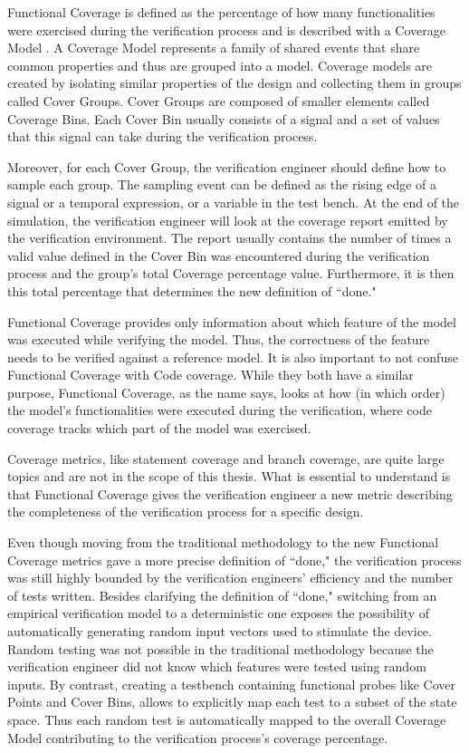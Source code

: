 Functional Coverage is defined as the percentage of how many functionalities
were exercised during the verification process and is described with a Coverage
Model \cite{jain1995advanced}. A Coverage Model represents a family of shared
events that share common properties and thus are grouped into a model. Coverage
models are created by isolating similar properties of the design and collecting
them in groups called Cover Groups. Cover Groups are composed of smaller
elements called Coverage Bins. Each Cover Bin usually consists of a signal and a
set of values that this signal can take during the verification process.

Moreover, for each Cover Group, the verification engineer should define how to
sample each group. The sampling event can be defined as the rising edge of a
signal or a temporal expression, or a variable in the test bench. At the end of
the simulation, the verification engineer will look at the coverage report
emitted by the verification environment. The report usually contains the number
of times a valid value defined in the Cover Bin was encountered during the
verification process and the group's total Coverage percentage value.
Furthermore, it is then this total percentage that determines the new definition
of ``done."

Functional Coverage provides only information about which feature of the model
was executed while verifying the model. Thus, the correctness of the feature
needs to be verified against a reference model. It is also important to not
confuse Functional Coverage with Code coverage. While they both have a similar
purpose, Functional Coverage, as the name says, looks at how (in which order)
the model's functionalities were executed during the verification, where code
coverage tracks which part of the model was exercised.

Coverage metrics, like statement coverage and branch coverage, are quite large
topics and are not in the scope of this thesis. What is essential to understand
is that Functional Coverage gives the verification engineer a new metric
describing the completeness of the verification process for a specific design.

Even though moving from the traditional methodology to the new Functional
Coverage metrics gave a more precise definition of ``done," the verification
process was still highly bounded by the verification engineers' efficiency and
the number of tests written. Besides clarifying the definition of ``done,"
switching from an empirical verification model to a deterministic one exposes
the possibility of automatically generating random input vectors used to
stimulate the device. Random testing was not possible in the traditional
methodology because the verification engineer did not know which features were
tested using random inputs. By contrast, creating a testbench containing
functional probes like Cover Points and Cover Bins, allows to explicitly map
each test to a subset of the state space. Thus each random test is automatically
mapped to the overall Coverage Model contributing to the verification process's
coverage percentage.
 
